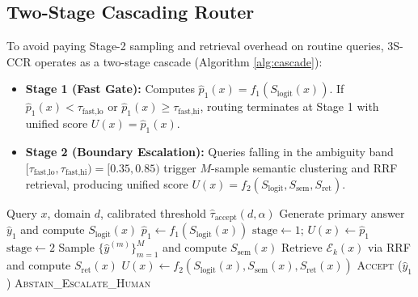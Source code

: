 \documentclass[10pt,conference]{IEEEtran}
\begin{document}
\subsection{Two-Stage Cascading Router}
To avoid paying Stage-2 sampling and retrieval overhead on routine queries, 3S-CCR operates as a two-stage cascade (Algorithm \ref{alg:cascade}):
\begin{itemize}
    \item \textbf{Stage 1 (Fast Gate):} Computes $\hat{p}_1(x) = f_1(S_{\text{logit}}(x))$. If $\hat{p}_1(x) < \tau_{\text{fast,lo}}$ or $\hat{p}_1(x) \ge \tau_{\text{fast,hi}}$, routing terminates at Stage 1 with unified score $U(x) = \hat{p}_1(x)$.
    \item \textbf{Stage 2 (Boundary Escalation):} Queries falling in the ambiguity band $[\tau_{\text{fast,lo}}, \tau_{\text{fast,hi}}) = [0.35, 0.85)$ trigger $M$-sample semantic clustering and RRF retrieval, producing unified score $U(x) = f_2(S_{\text{logit}}, S_{\text{sem}}, S_{\text{ret}})$.
\end{itemize}

\begin{algorithm}[t]
\caption{3S-CCR Two-Stage Conformal Cascade}
\label{alg:cascade}
\begin{algorithmic}[1]
\REQUIRE Query $x$, domain $d$, calibrated threshold $\hat{\tau}_{\text{accept}}(d, \alpha)$
\STATE Generate primary answer $\hat{y}_1$ and compute $S_{\text{logit}}(x)$
\STATE $\hat{p}_1 \leftarrow f_1(S_{\text{logit}}(x))$
    \STATE $\text{stage} \leftarrow 1$; \quad $U(x) \leftarrow \hat{p}_1$
\ELSE
    \STATE $\text{stage} \leftarrow 2$
    \STATE Sample $\{\hat{y}^{(m)}\}_{m=1}^{M}$ and compute $S_{\text{sem}}(x)$
    \STATE Retrieve $\mathcal{E}_k(x)$ via RRF and compute $S_{\text{ret}}(x)$
    \STATE $U(x) \leftarrow f_2(S_{\text{logit}}(x), S_{\text{sem}}(x), S_{\text{ret}}(x))$
\ENDIF
{}
    \RETURN \textsc{Accept} ($\hat{y}_1$)
\ELSE
    \RETURN \textsc{Abstain\_Escalate\_Human}
\ENDIF
\end{algorithmic}
\end{algorithm}
\end{document}
